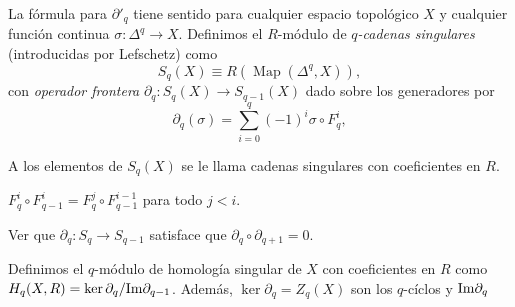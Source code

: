 \begin{definicion}
La fórmula para $\partial'_q$ tiene sentido para cualquier espacio topológico $X$ y cualquier función continua $\sigma \colon \Delta^q \to X$. Definimos el $R$-módulo de \textit{$q$-cadenas singulares} (introducidas por Lefschetz) como
\[
S_q(X) \equiv R(\operatorname{Map}(\Delta^q, X)),
\]
con \textit{operador frontera} $\partial_q \colon S_q(X) \to S_{q-1}(X)$ dado sobre los generadores por
\[
\partial_q(\sigma) = \sum_{i=0}^q (-1)^i \sigma \circ F_q^i,
\]
\end{definicion}
 \begin{nota}
     A los elementos de $S_q(X)$ se le llama cadenas singulares con coeficientes en $R$.
 \end{nota}
 \begin{ejercicio}
     $F_q^i\circ F_{q-1}^i=F_q^j\circ F_{q-1}^{i-1}$ para todo $j<i$.
 \end{ejercicio}
 \begin{ejercicio}
 Ver que $\partial_q:S_q\to S_{q-1}$ satisface que $\partial_q\circ \partial_{q+1}=0$.
 \end{ejercicio}
 \begin{definicion}
     Definimos el $q$-módulo de homología singular de $X$ con coeficientes en $R$ como $H_q(X,R)=\ker \partial_q/\mathrm{Im}\partial_{q-1}$. Además, $\ker\partial_q=Z_q(X)$ son los $q$-cíclos y $\mathrm{Im}\partial_{q}$ %
 \end{definicion}


